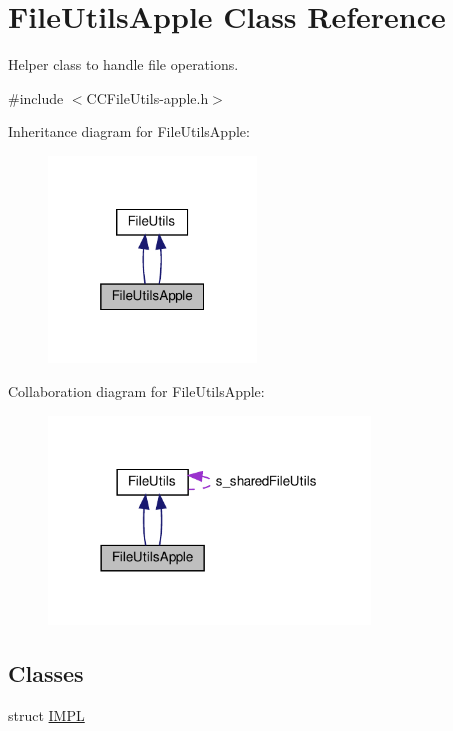 \hypertarget{classFileUtilsApple}{}\section{File\+Utils\+Apple Class Reference}
\label{classFileUtilsApple}


Helper class to handle file operations.  




{\ttfamily \#include $<$C\+C\+File\+Utils-\/apple.\+h$>$}



Inheritance diagram for File\+Utils\+Apple\+:
\nopagebreak
\begin{figure}[H]
\begin{center}
\leavevmode
\includegraphics[width=157pt]{classFileUtilsApple__inherit__graph}
\end{center}
\end{figure}


Collaboration diagram for File\+Utils\+Apple\+:
\nopagebreak
\begin{figure}[H]
\begin{center}
\leavevmode
\includegraphics[width=242pt]{classFileUtilsApple__coll__graph}
\end{center}
\end{figure}
\subsection*{Classes}
\begin{DoxyCompactItemize}
\item 
struct \hyperlink{structFileUtilsApple_1_1IMPL}{I\+M\+PL}
\end{DoxyCompactItemize}
